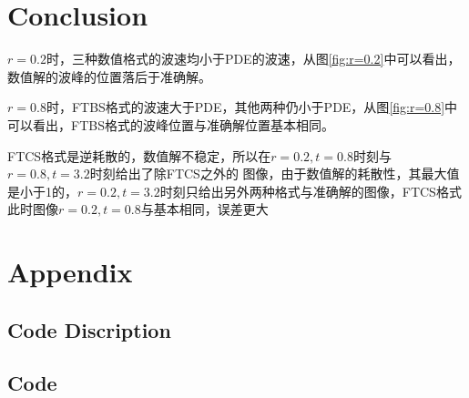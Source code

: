 \documentclass{article}
\begin{document}
\section{Conclusion}

$r=0.2$时，三种数值格式的波速均小于PDE的波速，从图\ref{fig:r=0.2}中可以看出，数值解的波峰的位置落后于准确解。

$r=0.8$时，FTBS格式的波速大于PDE，其他两种仍小于PDE，从图\ref{fig:r=0.8}中可以看出，FTBS格式的波峰位置与准确解位置基本相同。

FTCS格式是逆耗散的，数值解不稳定，所以在$r=0.2,t=0.8$时刻与$r=0.8,t=3.2$时刻给出了除FTCS之外的
图像，由于数值解的耗散性，其最大值是小于1的，$r=0.2,t=3.2$时刻只给出另外两种格式与准确解的图像，FTCS格式此时图像$r=0.2,t=0.8$与基本相同，误差更大
\section{Appendix}
\subsection{Code Discription}

\subsection{Code}

\end{document}
